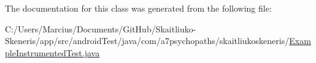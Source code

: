 The documentation for this class was generated from the following file\+:\begin{DoxyCompactItemize}
\item 
C\+:/\+Users/\+Marcius/\+Documents/\+Git\+Hub/\+Skaitliuko-\/\+Skeneris/app/src/android\+Test/java/com/a7psychopaths/skaitliukoskeneris/\mbox{\hyperlink{_example_instrumented_test_8java}{Example\+Instrumented\+Test.\+java}}\end{DoxyCompactItemize}
